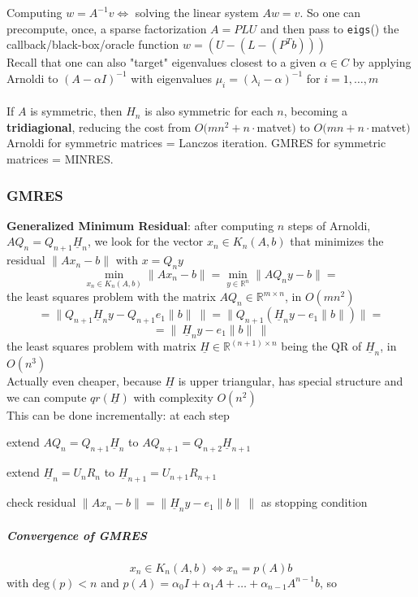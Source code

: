 \documentclass[10pt]{report}
\begin{document}
Computing $w=A^{-1}v \Leftrightarrow$ solving the linear system $Aw=v$. So one can precompute, once, a sparse factorization $A=PLU$ and then pass to \texttt{eigs}() the callback/black-box/oracle function $w = (U-(L-(P^Tb)))$\\
Recall that one can also "target" eigenvalues closest to a given $\alpha\in C$ by applying Arnoldi to $(A-\alpha I)^{-1}$ with eigenvalues $\mu_i = (\lambda_i-\alpha)^{-1}$ for $i=1,\ldots,m$\\\\
If $A$ is symmetric, then $H_n$ is also symmetric for each $n$, becoming a \textbf{tridiagional}, reducing the cost from $O(mn^2+n\cdot$matvet$)$ to $O(mn+n\cdot$matvet$)$\\
Arnoldi for symmetric matrices = Lanczos iteration. GMRES for symmetric matrices = MINRES.
\subsubsection{GMRES} \textbf{Generalized Minimum Residual}: after computing $n$ steps of Arnoldi, $AQ_n = Q_{n+1}\underline{H}_n$, we look for the vector $x_n\in K_n(A,b)$ that minimizes the residual $\|Ax_n-b\|$ with $x = Q_ny$ $$\min_{x_n\in K_n(A,b)}\|Ax_n-b\| = \min_{y\in \mathbb{R}^n} \|AQ_ny -b\|=$$ the least squares problem with the matrix $AQ_n\in \mathbb{R}^{m\times n}$, in $O(mn^2)$
$$=\|Q_{n+1}\underline{H}_ny-Q_{n+1}e_1\|b\|\:\|=\|Q_{n+1}\left(\underline{H}_ny-e_1\|b\|\right)\|=$$
$$= \|\:\underline{H}_n y - e_1\|b\|\:\|$$ the least squares problem with matrix $\underline{H}\in \mathbb{R}^{(n+1)\times n}$ being the QR of $\underline{H}_n$, in $O(n^3)$\\
Actually even cheaper, because $\underline{H}$ is upper triangular, has special structure and we can compute $qr(\underline{H})$ with complexity $O(n^2)$\\
This can be done incrementally: at each step
\begin{list}{}{}
	\item extend $AQ_n=Q_{n+1}\underline{H}_n$ to $AQ_{n+1} = Q_{n+2}\underline{H}_{n+1}$
	\item extend $\underline{H}_n = U_nR_n$ to $\underline{H}_{n+1}=U_{n+1}R_{n+1}$
	\item check residual $\|Ax_n-b\|=\|\underline{H}_ny-e_1\|b\|\:\|$ as stopping condition
\end{list}
\subparagraph{Convergence of GMRES} $$x_n\in K_n(A,b)\Leftrightarrow x_n = p(A)b$$ with $\text{deg}(p)<n$ and $p(A) = \alpha_0 I + \alpha_1 A + \ldots + \alpha_{n-1}A^{n-1}b$, so
\end{document}
